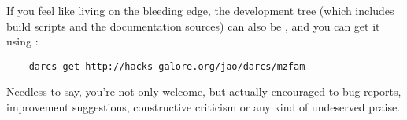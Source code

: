 If you feel like living on the bleeding edge, the development tree
(which includes build scripts and the documentation sources) can also
be , and
you can get it using :
\begin{verbatim}
    darcs get http://hacks-galore.org/jao/darcs/mzfam
\end{verbatim}

Needless to say, you're not only welcome, but actually encouraged to
 bug reports, improvement
suggestions, constructive criticism or any kind of undeserved praise.


